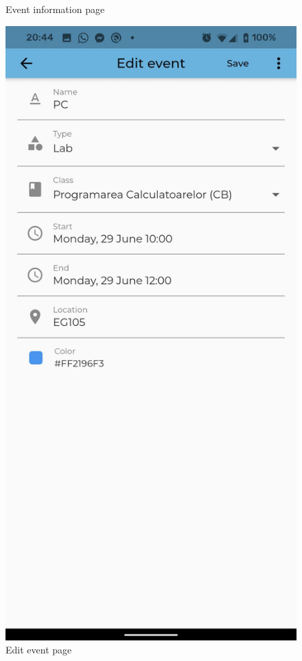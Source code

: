 \begin{figure}[!ht]
\begin{minipage}[b]{0.26\textwidth}
        \caption{Event information page}
        \label{4:fig:event}
    \end{minipage}
    \hfill
    \begin{minipage}[b]{0.26\textwidth}
        \captionsetup{justification=centering}
        \includegraphics[width=\textwidth]{figures/app/flutter/edit_event.jpg}
        \caption{Edit event page}
        \label{4:fig:edit_event}
    \end{minipage}
\end{figure}